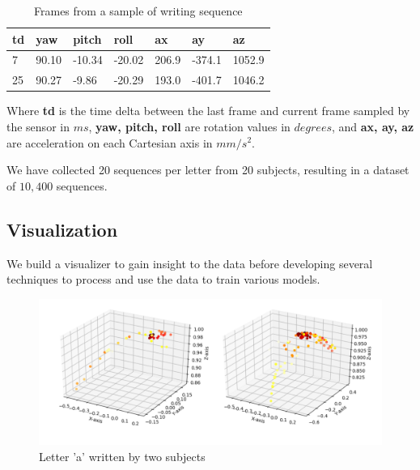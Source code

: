 \documentclass{article}
\begin{document}
\begin{multicols*}{2}
\vspace{-5px}

\begin{table}[H]
\centering
\begin{tabular}{lllllll}
\hline
td & yaw    & pitch  & roll   & ax     & ay      & az      \\ \hline
7  & 90.10 & -10.34 & -20.02 & 206.9 & -374.1 & 1052.9 \\
25 & 90.27  & -9.86  & -20.29 & 193.0 & -401.7 & 1046.2 \\ \hline
\end{tabular}
\vspace{3pt}
\caption{Frames from a sample of writing sequence}
\label{tab:sample-sequence}
\end{table}

\vspace{-8px}

Where \textbf{td} is the time delta between the last frame and current frame sampled by the sensor in $ms$, \textbf{yaw, pitch, roll} are rotation values in $degrees$, and \textbf{ax, ay, az} are acceleration on each Cartesian axis in $mm/s^2$.

We have collected 20 sequences per letter from 20 subjects, resulting in a dataset of $10,400$ sequences.

\subsection{Visualization}

We build a visualizer to gain insight to the data before developing several techniques to process and use the data to train various models.

\begin{figure}[H]
    \centering
    \includegraphics[scale=0.25]{viz_a_2_subj.png}
    \caption{Letter 'a' written by two subjects}
    \label{fig:viz_a}
\end{figure}


\end{multicols*}
\end{document}
